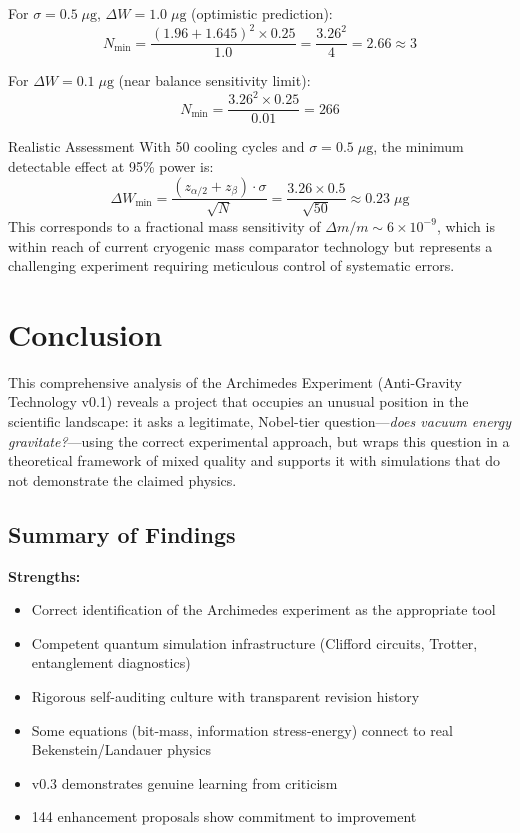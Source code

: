 \documentclass[11pt,a4paper]{article}
\begin{document}
For $\sigma = 0.5\;\mu\text{g}$, $\Delta W = 1.0\;\mu\text{g}$ (optimistic prediction):
\begin{equation}
  N_{\min} = \frac{(1.96 + 1.645)^2 \times 0.25}{1.0} = \frac{3.26^2}{4} = 2.66 \approx 3
\end{equation}

For $\Delta W = 0.1\;\mu\text{g}$ (near balance sensitivity limit):
\begin{equation}
  N_{\min} = \frac{3.26^2 \times 0.25}{0.01} = 266
\end{equation}

\begin{warnbox}{Realistic Assessment}
With 50 cooling cycles and $\sigma = 0.5\;\mu\text{g}$, the minimum detectable effect at 95\% power is:
\begin{equation}
  \Delta W_{\min} = \frac{(z_{\alpha/2} + z_\beta) \cdot \sigma}{\sqrt{N}} = \frac{3.26 \times 0.5}{\sqrt{50}} \approx 0.23\;\mu\text{g}
\end{equation}
This corresponds to a fractional mass sensitivity of $\Delta m/m \sim 6 \times 10^{-9}$, which is within reach of current cryogenic mass comparator technology but represents a challenging experiment requiring meticulous control of systematic errors.
\end{warnbox}

\section{Conclusion}

This comprehensive analysis of the Archimedes Experiment (Anti-Gravity Technology v0.1) reveals a project that occupies an unusual position in the scientific landscape: it asks a legitimate, Nobel-tier question---\textit{does vacuum energy gravitate?}---using the correct experimental approach, but wraps this question in a theoretical framework of mixed quality and supports it with simulations that do not demonstrate the claimed physics.

\subsection{Summary of Findings}

\textbf{Strengths:}
\begin{itemize}[leftmargin=1.5em]
  \item Correct identification of the Archimedes experiment as the appropriate tool
  \item Competent quantum simulation infrastructure (Clifford circuits, Trotter, entanglement diagnostics)
  \item Rigorous self-auditing culture with transparent revision history
  \item Some equations (bit-mass, information stress-energy) connect to real Bekenstein/Landauer physics
  \item v0.3 demonstrates genuine learning from criticism
  \item 144 enhancement proposals show commitment to improvement
\end{itemize}
\end{document}
